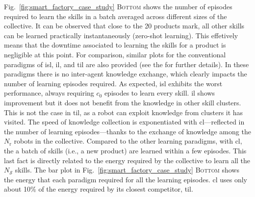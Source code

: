 \documentclass[12pt]{article}
\begin{document}
Fig.~\ref{fig:smart_factory_case_study} \textsc{Bottom} shows the number of episodes required to learn the skills in a batch averaged across different sizes of the collective. It can be observed that close to the 20 products mark, all other skills can be learned practically instantaneously (zero-shot learning). This effetively means that the downtime associated to learning the skills for a product is negligible at this point. For comparison, similar plots for the conventional paradigms of \ac{isl}, \ac{il}, and \ac{til} are also provided (see the  for further details). In these paradigms there is no inter-agent knowledge exchange, which clearly impacts the number of learning episodes required. As expected, \ac{isl} exhibits the worst performance, always requiring $c_0$ episodes to learn every skill. \ac{il} shows improvement but it does not benefit from the knowledge in other skill clusters. This is not the case in \ac{til}, as a robot can exploit knowledge from clusters it has visited. The speed of knowledge collection is exponentiated with \ac{cl}---reflected in the number of learning episodes---thanks to the exchange of knowledge among the $N_\mathrm{r}$ robots in the collective. Compared to the other learning paradigms, with \ac{cl}, the a batch of skills (i.e., a new product) are learned within a few episodes. This last fact is directly related to the energy required by the collective to learn all the $N_\mathcal{S}$ skills. The bar plot in Fig.~\ref{fig:smart_factory_case_study} \textsc{Bottom} shows the energy that each paradigm required for all the learning episodes. \Acl{cl} uses only about 10\% of the energy required by its closest competitor, \acl{til}.

\end{document}
